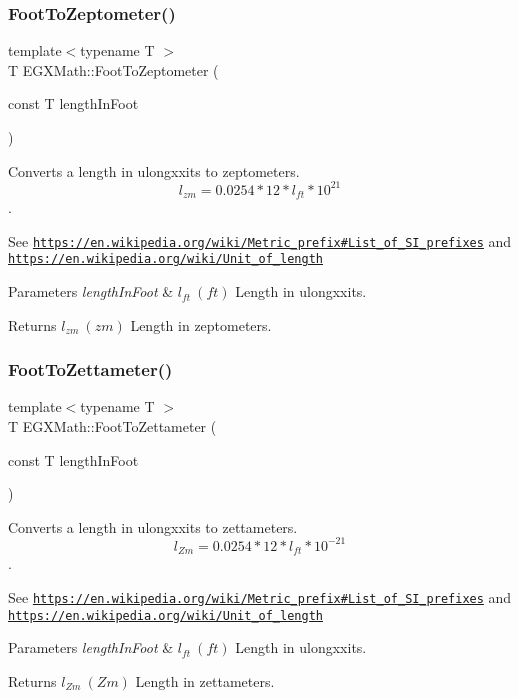 \subsubsection{\texorpdfstring{Foot\+To\+Zeptometer()}{FootToZeptometer()}}
{\footnotesize\ttfamily template$<$typename T $>$ \\
T E\+G\+X\+Math\+::\+Foot\+To\+Zeptometer (\begin{DoxyParamCaption}\item[{const T}]{length\+In\+Foot }\end{DoxyParamCaption})}



Converts a length in ulongxxits to zeptometers. \[ l_{zm}=0.0254 * 12 * l_{ft} * 10^{21} \]. 

See \href{https://en.wikipedia.org/wiki/Metric_prefix#List_of_SI_prefixes}{\tt https\+://en.\+wikipedia.\+org/wiki/\+Metric\+\_\+prefix\#\+List\+\_\+of\+\_\+\+S\+I\+\_\+prefixes} and \href{https://en.wikipedia.org/wiki/Unit_of_length}{\tt https\+://en.\+wikipedia.\+org/wiki/\+Unit\+\_\+of\+\_\+length} 
\begin{DoxyParams}{Parameters}
{\em length\+In\+Foot} & $ l_{ft}\ (ft)$ Length in ulongxxits. \\
\hline
\end{DoxyParams}
\begin{DoxyReturn}{Returns}
$ l_{zm}\ (zm)$ Length in zeptometers. 
\end{DoxyReturn}
\mbox{\label{group___e_g_x_math-_conversions-_length_conversions-_imperial-_foot-_s_i_gab3fbbb8c19effbba293a76e2141b03be}} 
\subsubsection{\texorpdfstring{Foot\+To\+Zettameter()}{FootToZettameter()}}
{\footnotesize\ttfamily template$<$typename T $>$ \\
T E\+G\+X\+Math\+::\+Foot\+To\+Zettameter (\begin{DoxyParamCaption}\item[{const T}]{length\+In\+Foot }\end{DoxyParamCaption})}



Converts a length in ulongxxits to zettameters. \[ l_{Zm}=0.0254 * 12 * l_{ft} * 10^{-21} \]. 

See \href{https://en.wikipedia.org/wiki/Metric_prefix#List_of_SI_prefixes}{\tt https\+://en.\+wikipedia.\+org/wiki/\+Metric\+\_\+prefix\#\+List\+\_\+of\+\_\+\+S\+I\+\_\+prefixes} and \href{https://en.wikipedia.org/wiki/Unit_of_length}{\tt https\+://en.\+wikipedia.\+org/wiki/\+Unit\+\_\+of\+\_\+length} 
\begin{DoxyParams}{Parameters}
{\em length\+In\+Foot} & $ l_{ft}\ (ft)$ Length in ulongxxits. \\
\hline
\end{DoxyParams}
\begin{DoxyReturn}{Returns}
$ l_{Zm}\ (Zm)$ Length in zettameters. 
\end{DoxyReturn}
